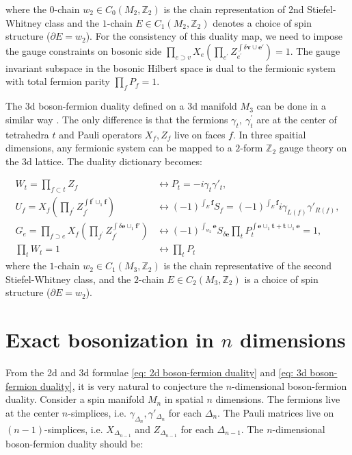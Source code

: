 \documentclass[12pt]{article}
\newcommand{\ZZ}{{\mathbb Z}}
\newcommand{\g}{\gamma}
\begin{document}
where the $0$-chain $w_2 \in C_0(M_2,\ZZ_2)$ is the chain representation of 2nd Stiefel-Whitney class and the $1$-chain $E \in C_1(M_2,\ZZ_2)$ denotes a choice of spin structure ($\partial E = w_2$). For the consistency of this duality map, we need to impose the gauge constraints on bosonic side $\prod_{e \supset v} X_e  (\prod_{e^\prime} Z_{e^\prime}^{\int \delta \boldsymbol  v \cup \boldsymbol e'})= 1$. The gauge invariant subspace in the bosonic Hilbert space is dual to the fermionic system with total fermion parity $\prod_f P_f=1$.

The 3d boson-fermion duality defined on a 3d manifold $M_3$ can be done in a similar way \cite{CK18}. The only difference is that the fermions $\g_t,~\g_t^\prime$ are at the center of tetrahedra $t$ and Pauli operators $X_f,Z_f$ live on faces $f$.  In three spaitial dimensions, any fermionic system can be mapped to a $2$-form $\ZZ_2$ gauge theory on the 3d lattice. The duality dictionary becomes:

\begin{equation}
\begin{split}
W_t = \prod_{f \subset t} Z_f&\longleftrightarrow P_t = -i\gamma_t\gamma'_t, \\
{U}_f = X_f (\prod_{f^\prime} Z_{f^\prime}^{\int \boldsymbol f^\prime \cup_1 \boldsymbol f})
&\longleftrightarrow (-1)^{\int_E \boldsymbol f} S_f = (-1)^{\int_E \boldsymbol f} i\gamma_{L(f)}\gamma'_{R(f)},\\
G_e  = \prod_{f \supset e} X_f  (\prod_{f^\prime} Z_{f^\prime}^{\int \delta \boldsymbol e \cup_1 \boldsymbol f'}) &\longleftrightarrow (-1)^{\int_{w_2} \boldsymbol e} S_{\delta \boldsymbol e} \prod_{t} P_t^{\int \boldsymbol e \cup_1 \boldsymbol t + \boldsymbol t \cup_1 \boldsymbol e} = 1, \\
\prod_t W_t = 1 &\longleftrightarrow \prod_t P_t
\end{split}
\label{eq: 3d boson-fermion duality}
\end{equation}
where the $1$-chain $w_2 \in C_1(M_3,\ZZ_2)$ is the chain representative of the second Stiefel-Whitney class, and the $2$-chain $E \in C_2(M_3,\ZZ_2)$ is a choice of spin structure ($\partial E = w_2$).



\section{Exact bosonization in $n$ dimensions}

From the 2d and 3d formulae \eqref{eq: 2d boson-fermion duality} and \eqref{eq: 3d boson-fermion duality}, it is very natural to conjecture the $n$-dimensional boson-fermion duality. Consider a spin manifold $M_n$ in spatial $n$ dimensions. The fermions live at the center $n$-simplices, i.e. $\g_{\Delta_n},\g'_{\Delta_n}$ for each $\Delta_n$.  The Pauli matrices live on $(n-1)$-simplices, i.e. $X_{\Delta_{n-1}}$ and $Z_{\Delta_{n-1}}$ for each $\Delta_{n-1}$. The $n$-dimensional boson-fermion duality should be:
\end{document}
